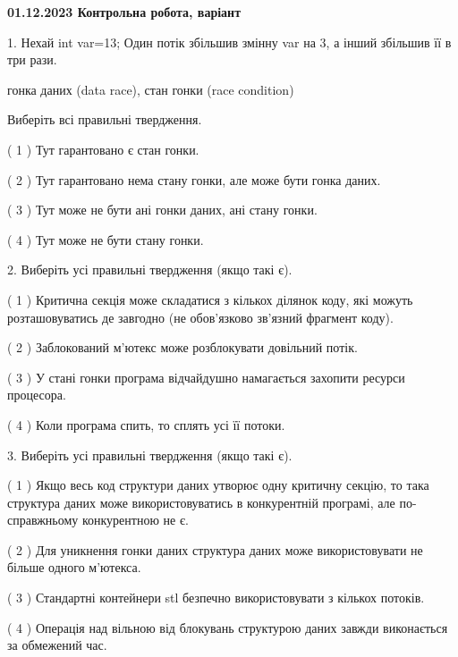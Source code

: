 \documentclass[12pt, ukrainian]{article}
\begin{document}
\vspace{4mm}
\newpage
\begin {large}

\textbf{01.12.2023 Контрольна робота, варіант  }\par


{
1. Нехай int var=13; Один потік збільшив змінну var на 3, а інший збільшив її в три рази.

гонка даних (data race), стан гонки (race condition)

Виберіть всі правильні твердження.\par
\vspace{2mm}
( 1 ) Тут гарантовано є стан гонки.%

( 2 ) Тут гарантовано нема стану гонки, але може бути гонка даних.%

( 3 ) Тут може не бути ані гонки даних, ані стану гонки.%

( 4 ) Тут може не бути стану гонки.%


\vspace{5mm}
2. Виберіть усі правильні твердження (якщо такі є).\par
\vspace{2mm}

( 1 ) Критична секція може складатися з кількох ділянок коду, які можуть розташовуватись де завгодно (не обов’язково зв’язний фрагмент коду).%

( 2 ) Заблокований м’ютекс може розблокувати довільний потік.%

( 3 ) У стані гонки програма відчайдушно намагається захопити ресурси процесора.%

( 4 ) Коли програма спить, то сплять усі її потоки.%


\vspace{5mm}
3. Виберіть усі правильні твердження (якщо такі є).\par
\vspace{2mm}

( 1 ) Якщо весь код структури даних утворює одну критичну секцію, то така структура даних може використовуватись в конкурентній програмі, але по-справжньому конкурентною не є.%

( 2 ) Для уникнення гонки даних структура даних може використовувати не більше одного м’ютекса.%

( 3 ) Стандартні контейнери stl безпечно використовувати з кількох потоків.%

( 4 ) Операція над вільною від блокувань структурою даних завжди виконається за обмежений час.%


}
\end{large}
\end{document}

